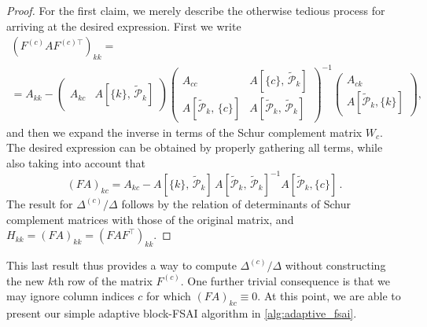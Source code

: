 \documentclass[a4paper]{article}
\theoremstyle{plain}
\theoremstyle{definition}
\theoremstyle{remark}
\begin{document}
\begin{proof}
	For the first claim, we merely describe the otherwise tedious process for arriving at the desired expression. First we write
	\begin{multline*}
		(F^{(c)} A F^{(c)\top})_{kk} =\\
        = A_{kk} -
		\begin{pmatrix}
			A_{kc} & A[\{k\},\, \tilde{\mathcal{P}}_k]
		\end{pmatrix} \begin{pmatrix}
			A_{cc} & A[\{c\},\, \tilde{\mathcal{P}}_k] \\
			A[\tilde{\mathcal{P}}_k,\, \{c\}] & A[\tilde{\mathcal{P}}_k,\, \tilde{\mathcal{P}}_k]
		\end{pmatrix}^{-1} \begin{pmatrix}
			A_{ck} \\ A[\tilde{\mathcal{P}}_k, \{k\}]
		\end{pmatrix},
	\end{multline*}
	and then we expand the inverse in terms of the Schur complement matrix \(W_c\). The desired expression can be obtained by properly gathering all terms, while also taking into account that
	\begin{equation*}
		(FA)_{kc} = A_{kc} - A[\{k\},\, \tilde{\mathcal{P}}_k] \, A[\tilde{\mathcal{P}}_k,\, \tilde{\mathcal{P}}_k]^{-1} A[\tilde{\mathcal{P}}_k, \{c\}]\,.
	\end{equation*}
	The result for \(\Delta^{(c)} / \Delta\) follows by the relation of determinants of Schur complement matrices with those of the original matrix, and \(H_{kk} = (FA)_{kk} = (FAF^{\top})_{kk}\).
\end{proof}

This last result thus provides a way to compute \(\Delta^{(c)} / \Delta\) without constructing the new \(k\)th row of the matrix \(F^{(c)}\). One further trivial consequence is that we may ignore column indices \(c\) for which \((FA)_{kc} \equiv 0\). At this point, we are able to present our simple adaptive block-FSAI algorithm in \cref{alg:adaptive_fsai}.
\end{document}
